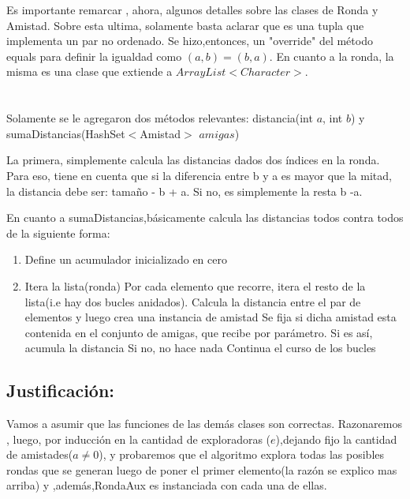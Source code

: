 \documentclass[10pt, a4paper]{article}
\begin{document}
Es importante remarcar , ahora, algunos detalles sobre las clases de Ronda y Amistad.
Sobre esta ultima, solamente basta aclarar que es una tupla que implementa un par no ordenado. Se hizo,entonces, un "override" del método equals para definir la igualdad como $(a,b) = (b,a).$
En cuanto a la ronda, la misma es una clase que extiende a $ArrayList<Character>$.\\ \\ \\
Solamente se le agregaron dos métodos relevantes:
distancia(int $a$, int $b$) y sumaDistancias(HashSet$<$Amistad$>$ $amigas$)

La primera, simplemente calcula las distancias dados dos índices en la ronda. Para eso, tiene en cuenta que si la diferencia entre b y a es mayor que la mitad, la distancia debe ser: tamaño - b + a. Si no, es simplemente la resta b -a.

En cuanto a sumaDistancias,básicamente calcula las distancias todos contra todos de la siguiente forma:

\begin{enumerate}
 \item Define un acumulador inicializado en cero
\item Itera la lista(ronda)
	\subitem Por cada elemento que recorre, itera el resto de la lista(i.e hay dos bucles anidados).
	\subitem Calcula la distancia entre el par de elementos y luego crea una instancia de amistad
	\subitem Se fija si dicha amistad esta contenida en el conjunto de amigas, que recibe por parámetro.
		\subitem \hspace{6mm} Si es así, acumula la distancia
		\subitem \hspace{6mm} Si no, no hace nada
	\subitem Continua el curso de los bucles
\end{enumerate}


\subsection{Justificación:}

Vamos a asumir que las funciones de las demás clases son correctas. Razonaremos , luego, por inducción en la cantidad de exploradoras ($e$),dejando fijo la cantidad de amistades($a \neq 0$), y probaremos que el algoritmo explora todas las posibles rondas que se generan luego de poner el primer elemento(la razón se explico mas arriba) y ,además,RondaAux es instanciada con cada una de ellas.\\
\end{document}
